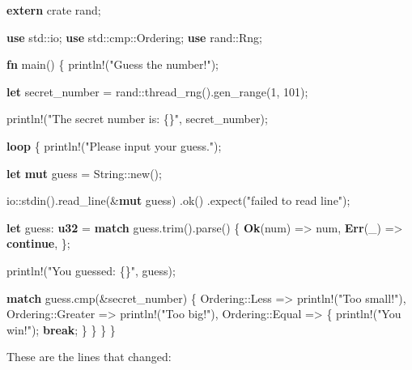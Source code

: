 \documentclass[a4paper,]{book}
\newenvironment{Shaded}{\begin{snugshade}}{\end{snugshade}}
\newcommand{\KeywordTok}[1]{\textcolor[rgb]{0.13,0.29,0.53}{\textbf{{#1}}}}
\newcommand{\DecValTok}[1]{\textcolor[rgb]{0.00,0.00,0.81}{{#1}}}
\newcommand{\StringTok}[1]{\textcolor[rgb]{0.31,0.60,0.02}{{#1}}}
\newcommand{\OtherTok}[1]{\textcolor[rgb]{0.56,0.35,0.01}{{#1}}}
\newcommand{\NormalTok}[1]{{#1}}
\begin{document}
\begin{Shaded}
\begin{Highlighting}[]
\KeywordTok{extern} \NormalTok{crate rand;}

\KeywordTok{use} \NormalTok{std::io;}
\KeywordTok{use} \NormalTok{std::cmp::Ordering;}
\KeywordTok{use} \NormalTok{rand::Rng;}

\KeywordTok{fn} \NormalTok{main() \{}
    \OtherTok{println!}\NormalTok{(}\StringTok{"Guess the number!"}\NormalTok{);}

    \KeywordTok{let} \NormalTok{secret_number = rand::thread_rng().gen_range(}\DecValTok{1}\NormalTok{, }\DecValTok{101}\NormalTok{);}

    \OtherTok{println!}\NormalTok{(}\StringTok{"The secret number is: \{\}"}\NormalTok{, secret_number);}

    \KeywordTok{loop} \NormalTok{\{}
        \OtherTok{println!}\NormalTok{(}\StringTok{"Please input your guess."}\NormalTok{);}

        \KeywordTok{let} \KeywordTok{mut} \NormalTok{guess = String::new();}

        \NormalTok{io::stdin().read_line(&}\KeywordTok{mut} \NormalTok{guess)}
            \NormalTok{.ok()}
            \NormalTok{.expect(}\StringTok{"failed to read line"}\NormalTok{);}

        \KeywordTok{let} \NormalTok{guess: }\KeywordTok{u32} \NormalTok{= }\KeywordTok{match} \NormalTok{guess.trim().parse() \{}
            \KeywordTok{Ok}\NormalTok{(num) => num,}
            \KeywordTok{Err}\NormalTok{(_) => }\KeywordTok{continue}\NormalTok{,}
        \NormalTok{\};}

        \OtherTok{println!}\NormalTok{(}\StringTok{"You guessed: \{\}"}\NormalTok{, guess);}

        \KeywordTok{match} \NormalTok{guess.cmp(&secret_number) \{}
            \NormalTok{Ordering::Less    => }\OtherTok{println!}\NormalTok{(}\StringTok{"Too small!"}\NormalTok{),}
            \NormalTok{Ordering::Greater => }\OtherTok{println!}\NormalTok{(}\StringTok{"Too big!"}\NormalTok{),}
            \NormalTok{Ordering::Equal   => \{}
                \OtherTok{println!}\NormalTok{(}\StringTok{"You win!"}\NormalTok{);}
                \KeywordTok{break}\NormalTok{;}
            \NormalTok{\}}
        \NormalTok{\}}
    \NormalTok{\}}
\NormalTok{\}}
\end{Highlighting}
\end{Shaded}

These are the lines that changed:
\end{document}
